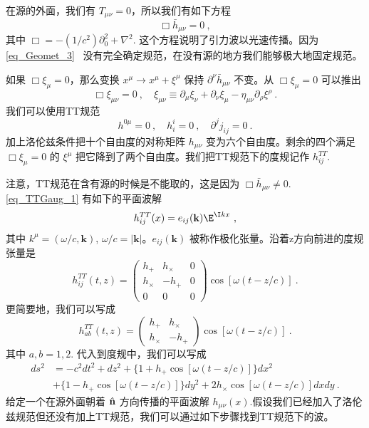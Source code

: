 
\begin{issues}
\issueNeedCite
\issueMissDepend
\end{issues}

在源的外面，我们有 $T_{\mu\nu} = 0$，所以我们有如下方程
\begin{equation}\label{eq_TTGaug_1}
\Box \bar h_{\mu\nu} = 0 ~,
\end{equation}
其中 $\Box = - (1/c^2) \partial_0^2 +\nabla^2$. 这个方程说明了引力波以光速传播。因为\autoref{eq_Geomet_3}~ 没有完全确定规范，在没有源的地方我们能够极大地固定规范。

如果 $\Box \xi_\mu = 0$，那么变换 $x^\mu \rightarrow x^\mu+\xi^\mu$ 保持 $\partial^\nu \bar h_{\mu\nu}$ 不变。从 $\Box \xi_\mu = 0$ 可以推出
\begin{equation}
\Box \xi_{\mu\nu} = 0~, \quad \xi_{\mu\nu} \equiv \partial_{\mu} \xi_\nu +\partial_\nu \xi_\mu - \eta_{\mu\nu} \partial_\rho\xi^\rho~. 
\end{equation}
我们可以使用TT规范
\begin{equation}
h^{0\mu} = 0~, \quad h^i_i = 0~, \quad \partial^j j_{ij} = 0~.
\end{equation}
加上洛伦兹条件把十个自由度的对称矩阵 $h_{\mu\nu}$ 变为六个自由度。剩余的四个满足 $\Box \xi_\mu = 0$ 的 $\xi^\mu$ 把它降到了两个自由度。我们把TT规范下的度规记作 $h_{ij}^{TT}$. 

注意，TT规范在含有源的时候是不能取的，这是因为 $\Box \bar h_{\mu\nu} \neq 0$. \autoref{eq_TTGaug_1} 有如下的平面波解
\begin{equation}
h_{ij}^{TT} (x) = e_{ij} (\mathbf k) \E^{\I kx} ~,  
\end{equation}
其中 $k^\mu = (\omega/c,\mathbf k)$, $\omega/c = |\mathbf k|$。$e_{ij}(\mathbf k)$ 被称作极化张量。沿着z方向前进的度规张量是
\begin{equation}
h_{ij}^{TT} (t,z) = 
\begin{pmatrix}
h_+ & h_\times & 0 \\
h_\times & - h_+ & 0 \\
0 & 0 & 0
\end{pmatrix} \cos [\omega (t - z/c)]~. 
\end{equation}
更简要地，我们可以写成
\begin{equation}\label{eq_TTGaug_2}
h_{ab}^{TT} (t,z) = 
\begin{pmatrix}
h_+ & h_\times   \\
h_\times & - h_+   
\end{pmatrix} \cos [\omega (t - z/c)]~. 
\end{equation}
其中 $a,b = 1,2$. 代入到度规中，我们可以写成
\begin{equation}
\begin{aligned}
ds^2 & = - c^2 dt^2 + dz^2 + \{ 1+ h_+ \cos [\omega(t-z/c)] \} dx^2 \\
& + \{ 1-h_+ \cos [\omega(t-z/c)] \} dy^2 + 2 h_\times \cos[\omega(t-z/c)] dx dy~.
\end{aligned}
\end{equation}
给定一个在源外面朝着 $\hat{\bf{n}}$ 方向传播的平面波解 $h_{\mu\nu}(x)$.假设我们已经加入了洛伦兹规范但还没有加上TT规范，我们可以通过如下步骤找到TT规范下的波。

